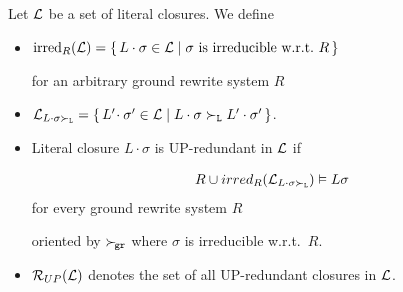    \begin{definition}[UP-Redundancy]
        Let \( \mathcal{L} \) be a set of literal closures. We define
       \begin{itemize}
           \item \( \operatorname{irred}_R(\mathcal{L}) =
           \{ \,
            L\cdot\sigma\in\mathcal{L} \mid
           \sigma\text{ is irreducible w.r.t.~}R
           \, \} \)

        for an arbitrary ground rewrite system \( R \)

       \item
       \(
       \mathcal{L}_{L\cdot\sigma\mathrel\succ_{\mathtt{L}}} =
       \{ \,
        L'\!\cdot\sigma'\in\mathcal{L} \mid
        L\cdot\sigma\mathrel\succ_{\mathtt{L}} L'\cdot\sigma'
       \, \}
         \).

       \item Literal closure \( L\cdot\sigma \) is UP-redundant in \( \mathcal{L} \) if

       \begin{gather*}
            R \cup irred_R(\mathcal{L}_{L\cdot\sigma\mathrel\succ_{\mathtt{L}}}) \vDash L\sigma
       \end{gather*}
        for every ground rewrite system \( R \)

        oriented by \( \mathrel\succ_{\!\mathtt{gr}} \)
        where \( \sigma \) is irreducible w.r.t.~\( R \).

       \item
       \( \mathcal{R}_{UP}(\mathcal{L}) \) denotes the set of all UP-redundant closures in \( \mathcal{L} \).
   \end{itemize}
\end{definition}

